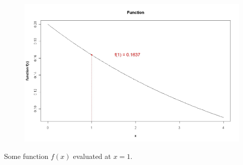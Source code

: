 \documentclass[12pt]{report}
\begin{document}
\vspace{-0.5cm}
\begin{figure}
	\centering
	\includegraphics[width=0.7\linewidth]{images/6AFunction}
	\caption{}
	\label{fig:6AFunction}
\end{figure}


Some function $f(x)$ evaluated at $x=1$.
\end{document}
